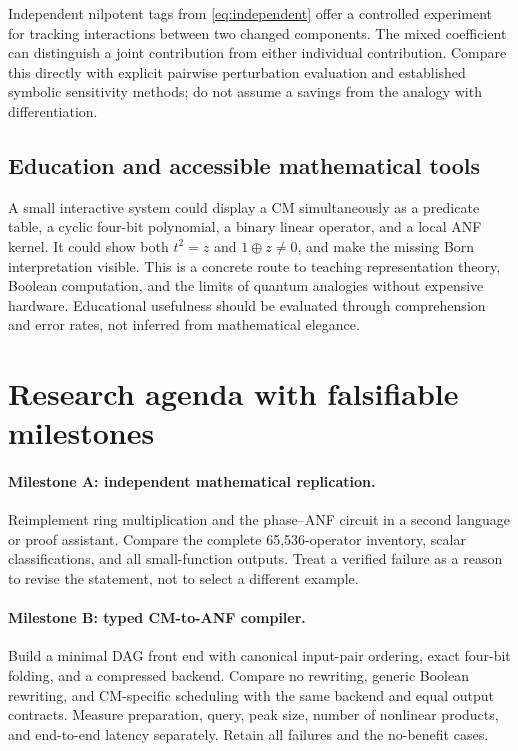 \documentclass[11pt,a4paper]{article}
\theoremstyle{definition}\newtheorem{definition}[theorem]{Definition}
\theoremstyle{remark}\newtheorem{remark}[theorem]{Remark}
\numberwithin{equation}{section}
\begin{document}
Independent nilpotent tags from \cref{eq:independent} offer a controlled experiment for tracking interactions between two changed components. The mixed coefficient can distinguish a joint contribution from either individual contribution. Compare this directly with explicit pairwise perturbation evaluation and established symbolic sensitivity methods; do not assume a savings from the analogy with differentiation.

\subsection{Education and accessible mathematical tools}
A small interactive system could display a CM simultaneously as a predicate table, a cyclic four-bit polynomial, a binary linear operator, and a local ANF kernel. It could show both $t^2=z$ and $1\oplus z\ne0$, and make the missing Born interpretation visible. This is a concrete route to teaching representation theory, Boolean computation, and the limits of quantum analogies without expensive hardware. Educational usefulness should be evaluated through comprehension and error rates, not inferred from mathematical elegance.

\section{Research agenda with falsifiable milestones}\label{sec:agenda}
\paragraph{Milestone A: independent mathematical replication.}
Reimplement ring multiplication and the phase--ANF circuit in a second language or proof assistant. Compare the complete 65,536-operator inventory, scalar classifications, and all small-function outputs. Treat a verified failure as a reason to revise the statement, not to select a different example.

\paragraph{Milestone B: typed CM-to-ANF compiler.}
Build a minimal DAG front end with canonical input-pair ordering, exact four-bit folding, and a compressed backend. Compare no rewriting, generic Boolean rewriting, and CM-specific scheduling with the same backend and equal output contracts. Measure preparation, query, peak size, number of nonlinear products, and end-to-end latency separately. Retain all failures and the no-benefit cases.
\end{document}
